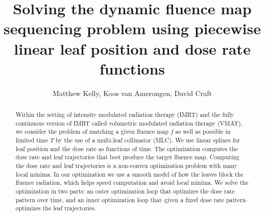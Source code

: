 \documentclass[12pt]{article}
\title{Solving the dynamic fluence map sequencing problem using piecewise linear leaf position and dose rate functions}
\author{Matthew Kelly, Koos van Amerongen, David Craft}
\affil[]{Department of Radiation Oncology, Massachusetts General Hospital, Harvard Medical School}
\begin{document}
\maketitle
\thispagestyle{empty}

\begin{abstract}
  Within the setting of intensity modulated radiation therapy (IMRT) and the fully continuous version of IMRT called
  volumetric modulated radiation therapy (VMAT), we consider the problem of matching a given fluence map $f$ as well as possible in
  limited time $T$ by the use of a multi-leaf collimator (MLC).
  We use linear splines for leaf position and the dose rate as functions of time.
  The optimization computes the dose rate and leaf trajectories that best produce
  the target fluence map.
  Computing the dose rate and leaf trajectories is a non-convex optimization problem
  with many local minima.
  In our optimization we use a smooth model of how the leaves block the fluence radiation,
  which helps speed computation and avoid local minima.
  We solve the optimization in two parts:
  an outer optimization loop that optimizes the dose rate pattern over time, and
  an inner optimization loop that--given a fixed dose rate pattern--optimizes the leaf trajectories.
\end{abstract}
\end{document}
